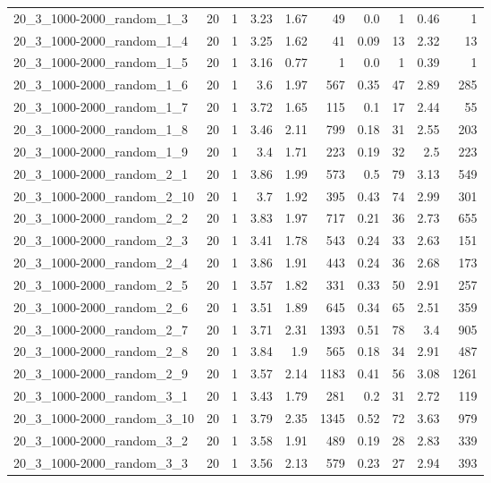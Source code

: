 \begin{center}
\begin{scriptsize}
\begin{longtable}{lrrrrrrrrr}
20\_3\_1000-2000\_random\_1\_3 & 20 & 1 & 3.23 & 1.67 & 49 & 0.0 & 1 & 0.46 & 1\\
20\_3\_1000-2000\_random\_1\_4 & 20 & 1 & 3.25 & 1.62 & 41 & 0.09 & 13 & 2.32 & 13\\
20\_3\_1000-2000\_random\_1\_5 & 20 & 1 & 3.16 & 0.77 & 1 & 0.0 & 1 & 0.39 & 1\\
20\_3\_1000-2000\_random\_1\_6 & 20 & 1 & 3.6 & 1.97 & 567 & 0.35 & 47 & 2.89 & 285\\
20\_3\_1000-2000\_random\_1\_7 & 20 & 1 & 3.72 & 1.65 & 115 & 0.1 & 17 & 2.44 & 55\\
20\_3\_1000-2000\_random\_1\_8 & 20 & 1 & 3.46 & 2.11 & 799 & 0.18 & 31 & 2.55 & 203\\
20\_3\_1000-2000\_random\_1\_9 & 20 & 1 & 3.4 & 1.71 & 223 & 0.19 & 32 & 2.5 & 223\\
20\_3\_1000-2000\_random\_2\_1 & 20 & 1 & 3.86 & 1.99 & 573 & 0.5 & 79 & 3.13 & 549\\
20\_3\_1000-2000\_random\_2\_10 & 20 & 1 & 3.7 & 1.92 & 395 & 0.43 & 74 & 2.99 & 301\\
20\_3\_1000-2000\_random\_2\_2 & 20 & 1 & 3.83 & 1.97 & 717 & 0.21 & 36 & 2.73 & 655\\
20\_3\_1000-2000\_random\_2\_3 & 20 & 1 & 3.41 & 1.78 & 543 & 0.24 & 33 & 2.63 & 151\\
20\_3\_1000-2000\_random\_2\_4 & 20 & 1 & 3.86 & 1.91 & 443 & 0.24 & 36 & 2.68 & 173\\
20\_3\_1000-2000\_random\_2\_5 & 20 & 1 & 3.57 & 1.82 & 331 & 0.33 & 50 & 2.91 & 257\\
20\_3\_1000-2000\_random\_2\_6 & 20 & 1 & 3.51 & 1.89 & 645 & 0.34 & 65 & 2.51 & 359\\
20\_3\_1000-2000\_random\_2\_7 & 20 & 1 & 3.71 & 2.31 & 1393 & 0.51 & 78 & 3.4 & 905\\
20\_3\_1000-2000\_random\_2\_8 & 20 & 1 & 3.84 & 1.9 & 565 & 0.18 & 34 & 2.91 & 487\\
20\_3\_1000-2000\_random\_2\_9 & 20 & 1 & 3.57 & 2.14 & 1183 & 0.41 & 56 & 3.08 & 1261\\
20\_3\_1000-2000\_random\_3\_1 & 20 & 1 & 3.43 & 1.79 & 281 & 0.2 & 31 & 2.72 & 119\\
20\_3\_1000-2000\_random\_3\_10 & 20 & 1 & 3.79 & 2.35 & 1345 & 0.52 & 72 & 3.63 & 979\\
20\_3\_1000-2000\_random\_3\_2 & 20 & 1 & 3.58 & 1.91 & 489 & 0.19 & 28 & 2.83 & 339\\
20\_3\_1000-2000\_random\_3\_3 & 20 & 1 & 3.56 & 2.13 & 579 & 0.23 & 27 & 2.94 & 393\\

\end{longtable}
\end{scriptsize}
\end{center}
